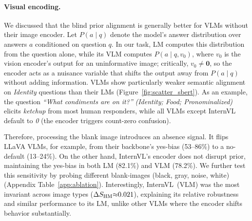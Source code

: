 \documentclass[letterpaper]{article}
\begin{document}
\paragraph{Visual encoding.}
We discussed that the blind prior alignment is generally better for VLMs without their image encoder. 
Let $P(a\mid q)$ denote the model's answer distribution over answers $a$ conditioned on question $q$.
In our task, LM computes this distribution from the question alone, while its VLM computes $P(a\mid q,v_0)$, where $v_0$ is the vision encoder's output for an uninformative image; critically, $v_0\!\neq\!\mathbf{0}$, so the encoder acts as a nuisance variable that shifts the output away from $P(a\mid q)$ without adding information. 
VLMs show particularly weaker semantic alignment on \textit{Identity} questions than their LMs (Figure~\ref{fig:scatter_sbert}). As an example, the question \textit{``What condiments are on it?''} \emph{(Identity; Food; Pronominalized)} elicits \textit{ketchup} from most human responders, while all VLMs except InternVL default to \textit{0} (the encoder triggers count-zero confusion).

Therefore, processing the blank image introduces an absence signal. It flips LLaVA VLMs, for example, from their backbone's yes-bias (53--86\%) to a no-default (13--24\%). %
On the other hand, InternVL's encoder does not disrupt prior, maintaining the yes-bias in both LM (82.1\%) and VLM (78.2\%). 
We further test this sensitivity by probing different blank-images (black, gray, noise, white) (Appendix Table~\ref{app:ablation}). 
Interestingly, InternVL~(VLM) was the most invariant across image types ($\Delta\sHM{\approx}0.021$), explaining its relative robustness and similar performance to its LM, unlike other VLMs where the encoder shifts behavior substantially.
\end{document}
